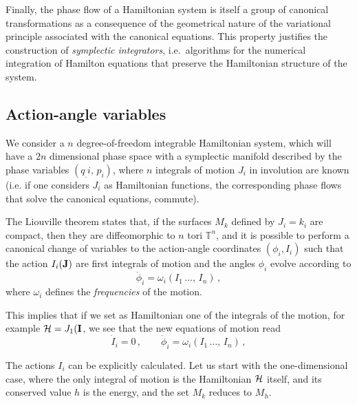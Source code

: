 Finally, the phase flow of a Hamiltonian system is itself a group of canonical transformations as a consequence of the geometrical nature of the variational principle associated with the canonical equations. This property justifies the construction of \textit{symplectic integrators}, i.e.\ algorithms for the numerical integration of Hamilton equations that preserve the Hamiltonian structure of the system.


\subsection{Action-angle variables}

We consider a $n$ degree-of-freedom integrable Hamiltonian system, which will have a $2n$ dimensional phase space with a symplectic manifold described by the phase variables $(q_.i,\,p_i)$, where $n$ integrals of motion $J_i$ in involution are known (i.e. if one considers $J_i$ as Hamiltonian functions, the corresponding phase flows that solve the canonical equations, commute).

The Liouville theorem states that, if the surfaces $M_{k}$ defined by $J_i=k_i$ are compact, then they are diffeomorphic to $n$ tori $\mathbb{T}^n$, and it is possible to perform a canonical change of variables to the action-angle coordinates $(\phi_i,I_i)$ such that the action $I_i(\vb{J})$ are first integrals of motion and the angles $\phi_i$ evolve according to
\begin{equation}
    \dot{\phi}_i = \omega_i(I_1\,\dots,\,I_n)\,, 
\end{equation}
where $\omega_i$ defines the \textit{frequencies} of the motion.

This implies that if we set as Hamiltonian one of the integrals of the motion, for example $\mathcal{H}=J_1(\vb{I}$, we see that the new equations of motion read
\begin{equation} 
    \dot I_i = 0\,, \qquad \dot \phi_i = \omega_i(I_1\,\dots,\,I_n) \,,
\end{equation} 


The actions $I_i$ can be explicitly calculated. Let us start with the one-di\-men\-sio\-nal case, where the only integral of motion is the Hamiltonian $\mathcal{H}$ itself, and its conserved value $h$ is the energy, and the set $M_k$ reduces to $M_h$.

